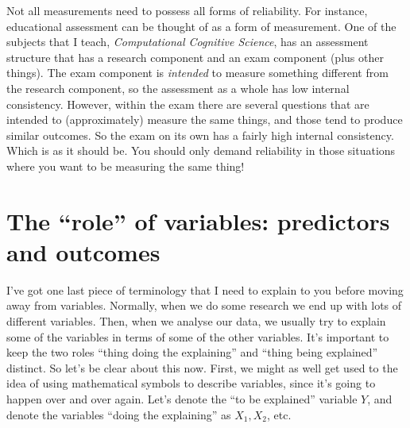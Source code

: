 \documentclass[
  a4paper,
]{book}
\begin{document}
Not all measurements need to possess all forms of reliability. For
instance, educational assessment can be thought of as a form of
measurement. One of the subjects that I teach, \emph{Computational
Cognitive Science}, has an assessment structure that has a research
component and an exam component (plus other things). The exam component
is \emph{intended} to measure something different from the research
component, so the assessment as a whole has low internal consistency.
However, within the exam there are several questions that are intended
to (approximately) measure the same things, and those tend to produce
similar outcomes. So the exam on its own has a fairly high internal
consistency. Which is as it should be. You should only demand
reliability in those situations where you want to be measuring the same
thing!

\section{The ``role'' of variables: predictors and
outcomes}\label{the-role-of-variables-predictors-and-outcomes}

I've got one last piece of terminology that I need to explain to you
before moving away from variables. Normally, when we do some research we
end up with lots of different variables. Then, when we analyse our data,
we usually try to explain some of the variables in terms of some of the
other variables. It's important to keep the two roles ``thing doing the
explaining'' and ``thing being explained'' distinct. So let's be clear
about this now. First, we might as well get used to the idea of using
mathematical symbols to describe variables, since it's going to happen
over and over again. Let's denote the ``to be explained'' variable
\(Y\), and denote the variables ``doing the explaining'' as
\(X_1 , X_2\), etc.
\end{document}
